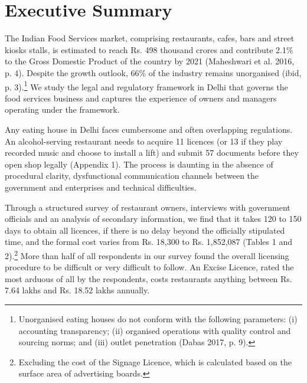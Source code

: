 \documentclass[a4paper, 12pt]{article}
\begin{document}
         
 
                        
                    \newpage
                    \section*{Executive Summary}
                    
                    
                    The Indian Food Services market, comprising restaurants, cafes, bars and street kiosks stalls, is estimated to reach Rs. 498 thousand crores and contribute 2.1\% to the Gross Domestic Product of the country by 2021 (Maheshwari et al. 2016, p. 4). 
Despite the growth outlook, 66\% of the industry remains unorganised (ibid, p. 3).\footnote{Unorganised eating houses do not conform with the following parameters: (i) accounting transparency; (ii) organised operations with quality control and sourcing norms; and 
(iii) outlet penetration (Dabas 2017, p. 9).}  We study the legal and regulatory framework in Delhi that governs the food services business and captures the experience of owners and managers operating under the framework.
                   
          Any eating house in Delhi faces cumbersome and often overlapping regulations. An alcohol-serving restaurant needs to acquire 11 licences (or 13 if they play recorded music and choose to install a lift) and submit 57 documents before they open shop legally 
(Appendix 1). The process is daunting in the absence of procedural clarity, dysfunctional communication channels between the government and enterprises and technical difficulties.  
                    
                    Through a structured survey of restaurant owners, interviews with government officials and an analysis of secondary information, we find that it takes 120 to 150 days to obtain all licences, if there is no delay beyond the officially stipulated time, and the 
formal cost varies from Rs. 18,300 to Rs. 1,852,087 (Tables 1 and 2).\footnote{Excluding the cost of the Signage Licence, which is calculated based on the surface area of advertising boards.} More than half of all respondents in our survey found the overall 
licensing procedure to be difficult or very difficult to follow. An Excise Licence, rated the most arduous of all by the respondents, costs restaurants anything between Rs. 7.64 lakhs and Rs. 18.52 lakhs annually. 
                    
\end{document}
